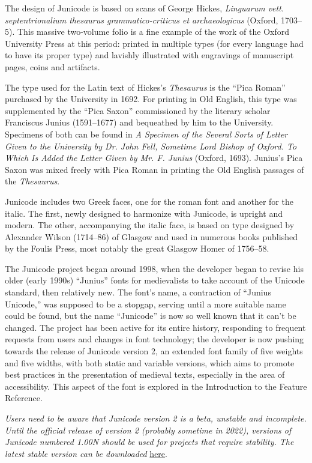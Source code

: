 \documentclass[12pt,letterpaper,openany]{book}
\newcounter{Feature}
\begin{document}
{\large%
\noindent The design of Junicode is based on scans of George Hickes,
{\itshape Linguarum vett. septentrionalium thesaurus
grammatico-criticus et archaeologicus} (Oxford, 1703–5). This massive two-volume folio is a fine
example of the work of the Oxford University Press at this
period: printed in multiple types (for every language had to
have its proper type) and lavishly
illustrated with engravings of manuscript pages, coins and
artifacts.

The type used for the Latin text of Hickes’s {\itshape Thesaurus} is the “Pica Roman”
purchased by the University in 1692. For printing in Old English, this type was
supplemented by the “Pica Saxon” commissioned by the literary scholar
Franciscus Junius (1591–1677) and bequeathed by him to
the University. Specimens of both can be found in {\itshape A Specimen of the
Several Sorts of Letter Given to the University by Dr. John Fell,
Sometime Lord Bishop of Oxford. To Which Is Added the Letter Given by
Mr. F. Junius} (Oxford, 1693). Junius’s Pica Saxon
was mixed freely with Pica Roman in printing the Old English passages
of the {\itshape Thesaurus}.

Junicode includes two Greek faces, one for the roman font and another
for the italic. The first, newly designed to harmonize with Junicode, is
upright and modern. The other, accompanying the italic face, is based on type designed by Alexander
Wilson (1714–86) of Glasgow and used in numerous books published by
the Foulis Press, most notably the great Glasgow Homer of 1756–58.

The Junicode project began around 1998, when the developer began to revise his
older (early 1990s) “Junius” fonts for medievalists to take account of the Unicode
standard, then relatively new. The font’s name, a contraction of
“Junius Unicode,” was supposed to be a stopgap, serving until a more suitable name
could be found, but the name “Junicode” is now so well known that it can’t be
changed. The project has been active for its entire history, responding to
frequent
requests from users and changes in font technology; the developer is now pushing
towards the release of Junicode version 2, an extended font family of five weights
and five widths, with both static and variable versions, which aims to
promote best practices in the presentation of medieval texts, especially in
the area of accessibility. This aspect of the font is explored in the
Introduction to the Feature Reference.

\textit{Users need to be aware that Junicode version 2 is a beta, unstable and
incomplete. Until the official release of version 2 (probably sometime in 2022), versions of Junicode
numbered \textsc{1.00N} should be used for projects that require
stability. The latest stable version can be downloaded} \href{https://github.com/psb1558/Junicode-font/releases}{here}.

}
\pagestyle{fancy}
\end{document}
